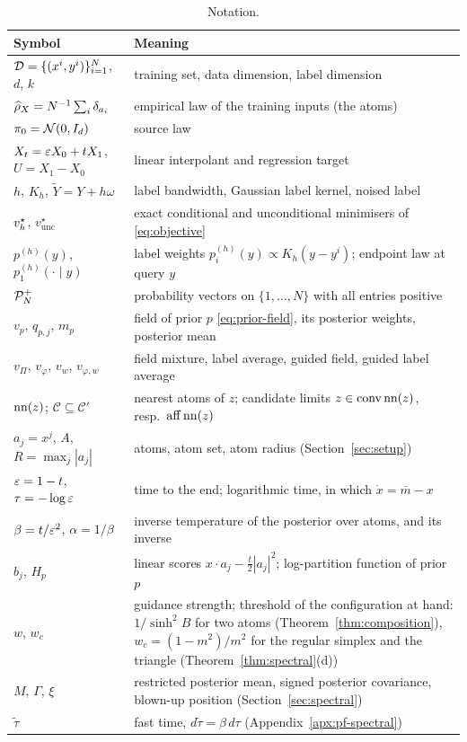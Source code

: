 \documentclass{article} %
\theoremstyle{plain}
\theoremstyle{definition}
\theoremstyle{remark}
\begin{document}
\begin{table}[h]
\centering\small
\begin{tabular}{@{}p{}p{}@{}}
\toprule
Symbol & Meaning\\
\midrule
$\mathcal{D}=\{(x^i,y^i)\}_{i=1}^N$, $d$, $k$ & training set, data dimension, label dimension\\
$\widehat{\rho}_X=N^{-1}\sum_i\delta_{a_i}$ & empirical law of the training inputs (the atoms)\\
$\pi_0=\mathcal{N}(0,I_d)$ & source law\\
$X_t=\varepsilon X_0+tX_1$, $U=X_1-X_0$ & linear interpolant and regression target\\
$h$, $K_h$, $\widetilde Y=Y+h\omega$ & label bandwidth, Gaussian label kernel, noised label\\
$v_h^\star$, $v_{\mathrm{unc}}^\star$ & exact conditional and unconditional minimisers of \eqref{eq:objective}\\
$p^{(h)}(y)$, $p_1^{(h)}(\cdot\mid y)$ & label weights $p_i^{(h)}(y)\propto K_h(y-y^i)$; endpoint law at query $y$\\
$\mathcal{P}_N^{+}$ & probability vectors on $\{1,\dots,N\}$ with all entries positive\\
$v_p$, $q_{p,j}$, $m_p$ & field of prior $p$ \eqref{eq:prior-field}, its posterior weights, posterior mean\\
$v_\Pi$, $v_\varphi$, $v_w$, $v_{\varphi,w}$ & field mixture, label average, guided field, guided label average\\
$\operatorname{nn}(z)$; $\mathcal C\subseteq\mathcal C'$ & nearest atoms of $z$; candidate limits $z\in\operatorname{conv}\operatorname{nn}(z)$, resp.\ $\operatorname{aff}\operatorname{nn}(z)$\\
$a_j=x^j$, $A$, $R=\max_j|a_j|$ & atoms, atom set, atom radius (Section~\ref{sec:setup})\\
$\varepsilon=1-t$, $\tau=-\log\varepsilon$ & time to the end; logarithmic time, in which $\dot x=\bar m-x$\\
$\beta=t/\varepsilon^2$, $\alpha=1/\beta$ & inverse temperature of the posterior over atoms, and its inverse\\
$b_j$, $H_p$ & linear scores $x\cdot a_j-\tfrac t2|a_j|^2$; log-partition function of prior $p$\\
$w$, $w_c$ & guidance strength; threshold of the configuration at hand: $1/\sinh^2B$ for two atoms (Theorem~\ref{thm:composition}), $w_c=(1-m^2)/m^2$ for the regular simplex and the triangle (Theorem~\ref{thm:spectral}(d))\\
$M$, $\Gamma$, $\xi$ & restricted posterior mean, signed posterior covariance, blown-up position (Section~\ref{sec:spectral})\\
$\tilde\tau$ & fast time, $d\tilde\tau=\beta\,d\tau$ (Appendix~\ref{apx:pf-spectral})\\
\bottomrule
\end{tabular}
\caption{Notation.}
\label{tab:notation}
\end{table}
\end{document}
